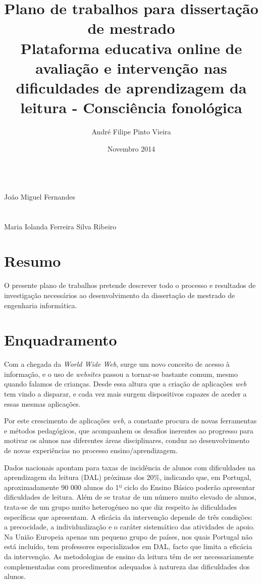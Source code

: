 \documentclass{article}
\title{\textbf{Plano de trabalhos para dissertação de mestrado}\\Plataforma educativa online de avaliação e intervenção nas dificuldades de aprendizagem da leitura - Consciência fonológica}
\author{André Filipe Pinto Vieira}
\affil{Departamento de Informática\\Universidade do Minho\\Mestrado em Engenharia Informática\\\sf{pg22777@alunos.uminho.pt}}
\date{Novembro 2014}
\begin{document}
\maketitle
{}\\
João Miguel Fernandes\\
\\

\\
Maria Iolanda Ferreira Silva Ribeiro\\

\newpage
\tableofcontents
\newpage

\section{Resumo}
O presente plano de trabalhos pretende descrever todo o processo e resultados de investigação necessários ao desenvolvimento da dissertação de mestrado de engenharia informática.

\section{Enquadramento}
Com a chegada da \textit{World Wide Web}, surge um novo conceito de acesso à informação, e o uso de \textit{websites} passou a tornar-se bastante comum, mesmo quando falamos de crianças. Desde essa altura que a criação de aplicações \textit{web} tem vindo a disparar, e cada vez mais surgem dispositivos capazes de aceder a essas mesmas aplicações.

Por este crescimento de aplicações \textit{web}, a constante procura de novas ferramentas e métodos pedagógicos, que acompanhem os desafios inerentes ao progresso para motivar os alunos nas diferentes áreas disciplinares, conduz ao desenvolvimento de novas experiências no processo ensino/aprendizagem. 

\bigskip
Dados nacionais apontam para taxas de incidência de alunos com dificuldades na aprendizagem da leitura (DAL) próximas dos 20\%, indicando que, em Portugal, aproximadamente 90 000 alunos do 1º ciclo do Ensino Básico poderão apresentar dificuldades de leitura. Além de se tratar de um número muito elevado de alunos, trata-se de um grupo muito heterogéneo no que diz respeito às dificuldades específicas que apresentam. A eficácia da intervenção depende de três condições: a precocidade, a individualização e o caráter sistemático das atividades de apoio. Na União Europeia apenas um pequeno grupo de países, nos quais Portugal não está incluído, tem professores especializados em DAL, facto que limita a eficácia da intervenção. As metodologias de ensino da leitura têm de ser necessariamente complementadas com procedimentos adequados à natureza das dificuldades dos alunos.
\end{document}

